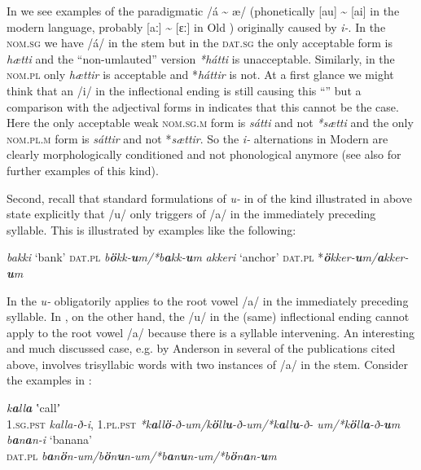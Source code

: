 \documentclass[output=paper,
modfonts
]{LSP/langsci}
\begin{document}
\noindent In  we see examples of the paradigmatic  /á
\textasciitilde{} æ/ (phonetically {[}au{]} \textasciitilde{} {[}ai{]}
in the modern language, probably {[}aː{]} \textasciitilde{} {[}ɛː{]} in
Old ) originally caused by \emph{i-}. In the
\textsc{nom.sg} we have /á/ in the stem but in the \textsc{dat.sg} the
only acceptable form is \emph{hætti} and the ``non-umlauted'' version
\emph{*hátti} is unacceptable. Similarly, in the \textsc{nom.pl} only
\emph{hættir} is acceptable and *\emph{háttir} is not. At a first glance
we might think that an /i/ in the inflectional ending is still causing
this ``'' but a comparison with the adjectival forms in 
indicates that this cannot be the case. Here the only acceptable weak
\textsc{nom.sg.m} form is \emph{sátti} and not \emph{*sætti} and the
only \textsc{nom.pl.m} form is \emph{sáttir} and not *\emph{sættir}. So
the \emph{i-} alternations in Modern  are clearly
morphologically conditioned and not phonological anymore (see also
\citealt[93]{thrainsson2011} for further examples of this kind).

Second, recall that standard  formulations of
\emph{u-} in  of the kind illustrated in  above state
explicitly that /u/ only triggers  of /a/ in the immediately
preceding syllable. This is illustrated by examples like the following:

\ea \label{ex:thrainsson:9}
	\ea \label{ex:thrainsson:9a}	\emph{bakki} `bank' \textsc{dat.pl}
		\emph{b\textbf{ö}kk-\textbf{u}m/*b\textbf{a}kk-\textbf{u}m}
	\ex \label{ex:thrainsson:9b}	\emph{akkeri} `anchor' \textsc{dat.pl}
		*\emph{\textbf{ö}kker-\textbf{u}m/\textbf{a}kker-\textbf{u}m}
	\z
\z

\noindent In  the \emph{u-} obligatorily applies to the root vowel /a/
in the immediately preceding syllable. In , on the other hand, the
/u/ in the (same) inflectional ending cannot apply to the root vowel /a/
because there is a syllable intervening. An interesting and much
discussed case, e.g. by Anderson in several of the publications cited
above, involves trisyllabic words with two instances of /a/ in the stem.
Consider the examples in :

\ea \label{ex:thrainsson:10}
	\ea \label{ex:thrainsson:10a}	\emph{k\textbf{a}ll\textbf{a}} ʽcallʼ\\
		\textsc{1.sg.pst} \emph{kalla-ð-i}, \textsc{1.pl.pst}
		\emph{*k\textbf{a}ll\textbf{ö}-ð-um/k\textbf{ö}ll\textbf{u}-ð-um/*k\textbf{a}ll\textbf{u}-ð-		um/*k\textbf{ö}ll\textbf{a}-ð-\textbf{u}m}
	\ex \label{ex:thrainsson:10b}	\emph{b\textbf{a}n\textbf{a}n-i} `banana'\\
		\textsc{dat.pl} \emph{b\textbf{a}n\textbf{ö}n-um/b\textbf{ö}n\textbf{u}n-um/*b\textbf{a}n\textbf{u}n-um/*b\textbf{ö}n\textbf{a}n-\textbf{u}m}
	\z
\z
\end{document}
